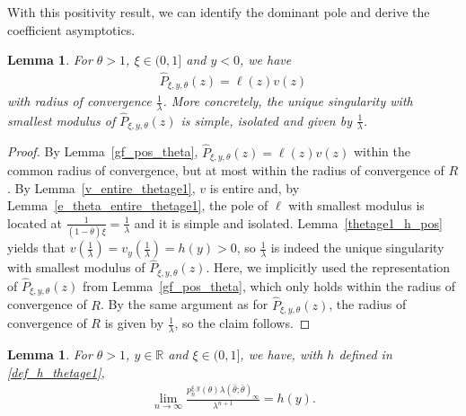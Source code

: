 \documentclass[12pt]{article}
\newcommand{\R}{\mathbb{R}} %
\newcommand{\1}{\mathds{1}}
\theoremstyle{definition}
\theoremstyle{plain}
\newtheorem{Lemma}[definition]{Lemma}
\theoremstyle{remark}
\begin{document}
With this positivity result, we can identify the dominant pole and derive the coefficient asymptotics.
\begin{Lemma}\label{gf_pos_theta_ge1}
     For $\theta>1$, $\xi\in(0,1]$ and $y< 0$, we have
    \begin{align*}
      \hat{P}_{\xi,y,\theta}(z)= \ell(z)v(z)
    \end{align*}
    with radius of convergence $\frac{1}{\lambda}$. More concretely, the unique singularity with smallest modulus of $\hat{P}_{\xi,y,\theta}(z)$ is simple, isolated and given by $\frac{1}{\lambda}$.
\end{Lemma}
\begin{proof}
By Lemma~\ref{gf_pos_theta}, $\hat{P}_{\xi,y,\theta}(z)= \ell(z)v(z)$ within the common radius of convergence, but at most within the radius of convergence of $R$. By Lemma~\ref{v_entire_thetage1}, $v$ is entire and, by Lemma~\ref{e_theta_entire_thetage1}, the pole of $\ell$ with smallest modulus is located at $\frac{1}{(1-\bar\theta)\xi}=\frac{1}{\lambda}$ and it is simple and isolated. Lemma~\ref{thetage1_h_pos} yields that $v\left(\frac{1}{\lambda}\right)=v_y\left(\frac{1}{\lambda}\right)=h(y)>0$, so $\frac{1}{\lambda}$ is indeed the unique singularity with smallest modulus of $\hat{P}_{\xi,y,\theta}(z)$. Here, we implicitly used the representation of $\hat{P}_{\xi,y,\theta}(z)$ from Lemma~\ref{gf_pos_theta}, which only holds within the radius of convergence of $R$. By the same argument as for $\hat{P}_{\xi,y,\theta}(z)$, the radius of convergence of $R$ is given by $\frac{1}{\lambda}$, so the claim follows.
\end{proof}
\begin{Lemma}\label{asymptotic_theta_ge1_neg_y}
  For $\theta>1$, $y\in\R$ and $\xi\in(0,1]$, we have, with $h$ defined in \eqref{def_h_thetage1},
  \begin{align*}
      \lim_{n\to\infty} \frac{p_n^{\xi,y}(\theta)\lambda(\bar\theta;\bar\theta)_\infty}{\lambda^{n+1}}=h(y).
  \end{align*}
\end{Lemma}
\end{document}
